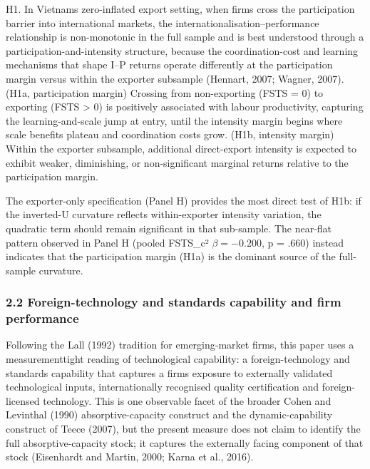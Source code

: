 \documentclass[12pt,a4paper]{article}
\begin{document}
H1. In Vietnam\textquotesingle s zero-inflated export setting, when
firms cross the participation barrier into international markets, the
internationalisation--performance relationship is non-monotonic in the
full sample and is best understood through a participation-and-intensity
structure, because the coordination-cost and learning mechanisms that
shape I--P returns operate differently at the participation margin
versus within the exporter subsample (Hennart, 2007; Wagner, 2007).
(H1a, participation margin) Crossing from non-exporting (FSTS = 0) to
exporting (FSTS \textgreater{} 0) is positively associated with labour
productivity, capturing the learning-and-scale jump at entry, until the
intensity margin begins where scale benefits plateau and coordination
costs grow. (H1b, intensity margin) Within the exporter subsample,
additional direct-export intensity is expected to exhibit weaker,
diminishing, or non-significant marginal returns relative to the
participation margin.

The exporter-only specification (Panel H) provides the most direct test
of H1b: if the inverted-U curvature reflects within-exporter intensity
variation, the quadratic term should remain significant in that
sub-sample. The near-flat pattern observed in Panel H (pooled FSTS\_c²
\(\beta = −0.200\), p = .660) instead indicates that the participation
margin (H1a) is the dominant source of the full-sample curvature.

\hypertarget{22-foreign-technology-and-standards-capability-and-firm-performance}{%
\subsubsection{2.2 Foreign-technology and standards capability and firm
performance}\label{22-foreign-technology-and-standards-capability-and-firm-performance}}

Following the Lall (1992) tradition for emerging-market firms, this
paper uses a measurementtight reading of technological capability: a
foreign-technology and standards capability that captures a
firm\textquotesingle s exposure to externally validated technological
inputs, internationally recognised quality certification and
foreign-licensed technology. This is one observable facet of the broader
Cohen and Levinthal (1990) absorptive-capacity construct and the
dynamic-capability construct of Teece (2007), but the present measure
does not claim to identify the full absorptive-capacity stock; it
captures the externally facing component of that stock (Eisenhardt and
Martin, 2000; Karna et al., 2016).
\end{document}
